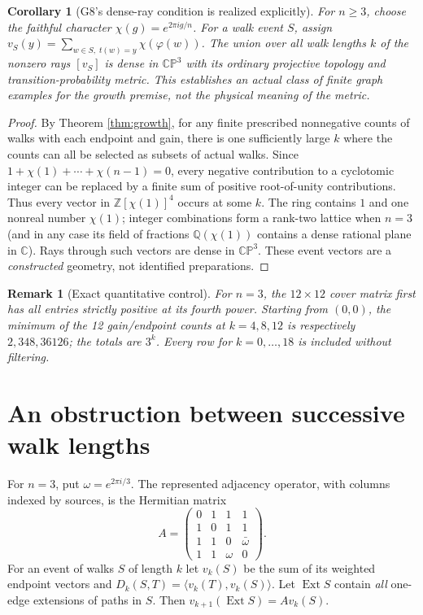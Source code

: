 \documentclass[11pt]{article}
\newtheorem{remark}[theorem]{Remark}
\newtheorem{corollary}[theorem]{Corollary}
\newcommand{\cp}{\mathbb{CP}}
\newcommand{\Z}{\mathbb Z}
\newcommand{\Ext}{\operatorname{Ext}}
\begin{document}
\begin{corollary}[G8's dense-ray condition is realized explicitly]
For $n\ge3$, choose the faithful character $\chi(g)=e^{2\pi ig/n}$. For a walk event $S$, assign $v_S(y)=\sum_{w\in S,\;t(w)=y}\chi(\varphi(w))$.
The union over all walk lengths $k$ of the nonzero rays $[v_S]$ is dense in $\cp^3$ with its ordinary projective topology and transition-probability metric. This establishes an actual class of finite graph examples for the growth premise, \emph{not} the physical meaning of the metric.
\end{corollary}
\begin{proof}
By Theorem \ref{thm:growth}, for any finite prescribed nonnegative counts of walks with each endpoint and gain, there is one sufficiently large $k$ where the counts can all be selected as subsets of actual walks. Since $1+\chi(1)+\cdots+\chi(n-1)=0$, every negative contribution to a cyclotomic integer can be replaced by a finite sum of positive root-of-unity contributions. Thus every vector in $\Z[\chi(1)]^4$ occurs at some $k$. The ring contains $1$ and one nonreal number $\chi(1)$; integer combinations form a rank-two lattice when $n=3$ (and in any case its field of fractions $\mathbb Q(\chi(1))$ contains a dense rational plane in $\mathbb C$). Rays through such vectors are dense in $\cp^3$. These event vectors are a \emph{constructed} geometry, not identified preparations.
\end{proof}
\begin{remark}[Exact quantitative control]
For $n=3$, the $12\times12$ cover matrix first has all entries strictly positive at its fourth power. Starting from $(0,0)$, the minimum of the 12 gain/endpoint counts at $k=4,8,12$ is respectively $2,348,36126$; the totals are $3^k$. Every row for $k=0,\ldots,18$ is included without filtering.
\end{remark}

\section{An obstruction between successive walk lengths}
For $n=3$, put $\omega=e^{2\pi i/3}$. The represented adjacency operator, with columns indexed by sources, is the Hermitian matrix
\begin{equation}
A=\begin{pmatrix}
0&1&1&1\\1&0&1&1\\1&1&0&\bar\omega\\1&1&\omega&0
\end{pmatrix}.
\end{equation}
For an event of walks $S$ of length $k$ let $v_k(S)$ be the sum of its weighted endpoint vectors and $D_k(S,T)=\langle v_k(T),v_k(S)\rangle$. Let $\Ext S$ contain \emph{all} one-edge extensions of paths in $S$. Then
\(v_{k+1}(\Ext S)=A v_k(S).\)
\end{document}
